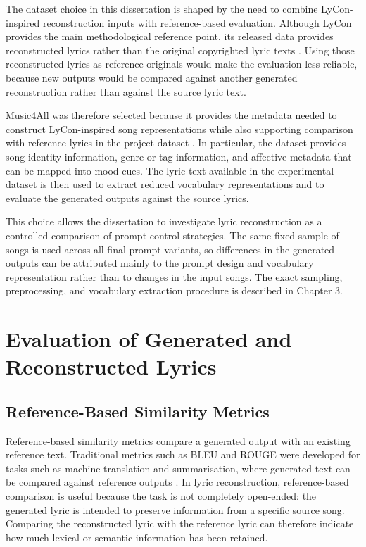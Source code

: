 The dataset choice in this dissertation is shaped by the need to combine LyCon-inspired reconstruction inputs with reference-based evaluation. Although LyCon provides the main methodological reference point, its released data provides reconstructed lyrics rather than the original copyrighted lyric texts \cite{kim2024lycon}. Using those reconstructed lyrics as reference originals would make the evaluation less reliable, because new outputs would be compared against another generated reconstruction rather than against the source lyric text.

Music4All was therefore selected because it provides the metadata needed to construct LyCon-inspired song representations while also supporting comparison with reference lyrics in the project dataset \cite{domingues2020music4all}. In particular, the dataset provides song identity information, genre or tag information, and affective metadata that can be mapped into mood cues. The lyric text available in the experimental dataset is then used to extract reduced vocabulary representations and to evaluate the generated outputs against the source lyrics.

This choice allows the dissertation to investigate lyric reconstruction as a controlled comparison of prompt-control strategies. The same fixed sample of songs is used across all final prompt variants, so differences in the generated outputs can be attributed mainly to the prompt design and vocabulary representation rather than to changes in the input songs. The exact sampling, preprocessing, and vocabulary extraction procedure is described in Chapter 3.

\section{Evaluation of Generated and Reconstructed Lyrics}

\subsection{Reference-Based Similarity Metrics}

Reference-based similarity metrics compare a generated output with an existing reference text. Traditional metrics such as BLEU and ROUGE were developed for tasks such as machine translation and summarisation, where generated text can be compared against reference outputs \cite{papineni2002bleu,lin2004rouge}. In lyric reconstruction, reference-based comparison is useful because the task is not completely open-ended: the generated lyric is intended to preserve information from a specific source song. Comparing the reconstructed lyric with the reference lyric can therefore indicate how much lexical or semantic information has been retained.


